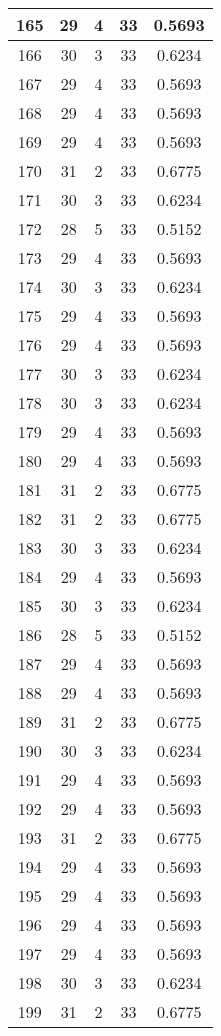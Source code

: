 \documentclass[letterpaper, 12pt]{article}
\begin{document}
\begin{longtable}{|c|c|c|c|c|}
\hline
165 & 29 & 4 & 33 & 0.5693 \\
\hline
166 & 30 & 3 & 33 & 0.6234 \\
\hline
167 & 29 & 4 & 33 & 0.5693 \\
\hline
168 & 29 & 4 & 33 & 0.5693 \\
\hline
169 & 29 & 4 & 33 & 0.5693 \\
\hline
170 & 31 & 2 & 33 & 0.6775 \\
\hline
171 & 30 & 3 & 33 & 0.6234 \\
\hline
172 & 28 & 5 & 33 & 0.5152 \\
\hline
173 & 29 & 4 & 33 & 0.5693 \\
\hline
174 & 30 & 3 & 33 & 0.6234 \\
\hline
175 & 29 & 4 & 33 & 0.5693 \\
\hline
176 & 29 & 4 & 33 & 0.5693 \\
\hline
177 & 30 & 3 & 33 & 0.6234 \\
\hline
178 & 30 & 3 & 33 & 0.6234 \\
\hline
179 & 29 & 4 & 33 & 0.5693 \\
\hline
180 & 29 & 4 & 33 & 0.5693 \\
\hline
181 & 31 & 2 & 33 & 0.6775 \\
\hline
182 & 31 & 2 & 33 & 0.6775 \\
\hline
183 & 30 & 3 & 33 & 0.6234 \\
\hline
184 & 29 & 4 & 33 & 0.5693 \\
\hline
185 & 30 & 3 & 33 & 0.6234 \\
\hline
186 & 28 & 5 & 33 & 0.5152 \\
\hline
187 & 29 & 4 & 33 & 0.5693 \\
\hline
188 & 29 & 4 & 33 & 0.5693 \\
\hline
189 & 31 & 2 & 33 & 0.6775 \\
\hline
190 & 30 & 3 & 33 & 0.6234 \\
\hline
191 & 29 & 4 & 33 & 0.5693 \\
\hline
192 & 29 & 4 & 33 & 0.5693 \\
\hline
193 & 31 & 2 & 33 & 0.6775 \\
\hline
194 & 29 & 4 & 33 & 0.5693 \\
\hline
195 & 29 & 4 & 33 & 0.5693 \\
\hline
196 & 29 & 4 & 33 & 0.5693 \\
\hline
197 & 29 & 4 & 33 & 0.5693 \\
\hline
198 & 30 & 3 & 33 & 0.6234 \\
\hline
199 & 31 & 2 & 33 & 0.6775 \\
\hline
\end{longtable}
\end{document}
